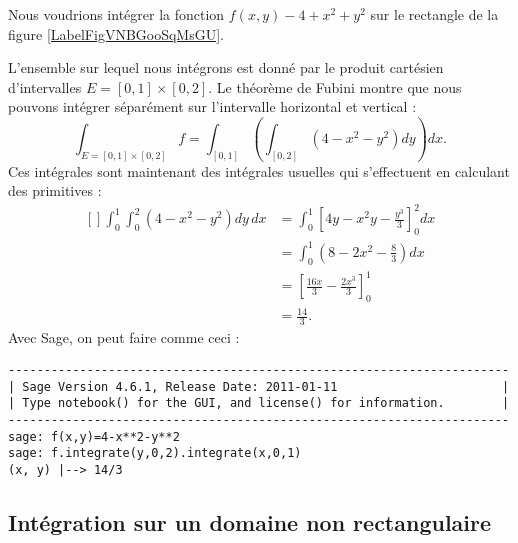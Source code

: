 \begin{example}
    Nous voudrions intégrer la fonction $f(x,y)-4+x^2+y^2$ sur le rectangle de la figure \ref{LabelFigVNBGooSqMsGU}. %
\newcommand{\CaptionFigVNBGooSqMsGU}{Intégration sur un rectangle}


    L'ensemble sur lequel nous intégrons est donné par le produit cartésien d'intervalles $E=[0,1]\times[0,2]$. Le théorème de Fubini montre que nous pouvons intégrer séparément sur l'intervalle horizontal et vertical :
    \begin{equation}
    	\int_{E=[0,1]\times[0,2]}f=\int_{[0,1]}\left( \int_{[0,2]}(4-x^2-y^2)dy \right)dx.
    \end{equation}
    Ces intégrales sont maintenant des intégrales usuelles qui s'effectuent en calculant des primitives :
    \begin{equation}
        \begin{aligned}[]
            \int_0^1\int_0^2(4-x^2-y^2)dy\,dx&=\int_0^1\left[ 4y-x^2y-\frac{ y^3 }{ 3 } \right]_0^2dx\\
            &=\int_0^1(8-2x^2-\frac{ 8 }{ 3 })dx\\
            &=\left[ \frac{ 16x }{ 3 }-\frac{ 2x^3 }{ 3 } \right]_0^1\\
            &=\frac{ 14 }{ 3 }.
        \end{aligned}
    \end{equation}
    Avec Sage, on peut faire comme ceci :

    \begin{verbatim}
----------------------------------------------------------------------
| Sage Version 4.6.1, Release Date: 2011-01-11                       |
| Type notebook() for the GUI, and license() for information.        |
----------------------------------------------------------------------
sage: f(x,y)=4-x**2-y**2                  
sage: f.integrate(y,0,2).integrate(x,0,1)
(x, y) |--> 14/3

    \end{verbatim}

\end{example}

\subsection{Intégration sur un domaine non rectangulaire}
\label{PgRapIntMultFubiniTri}

